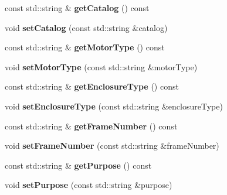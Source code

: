 \begin{DoxyCompactItemize}
\item 
\mbox{\label{class_motor_data_a051ccda5450df2ccae18db8087fe04b3}} 
const std\+::string \& {\bfseries get\+Catalog} () const
\item 
\mbox{\label{class_motor_data_ac7e264252a15a63a2fd35cbb114478e6}} 
void {\bfseries set\+Catalog} (const std\+::string \&catalog)
\item 
\mbox{\label{class_motor_data_a070b07fa26bcbd9b4ca8ccf5770387e4}} 
const std\+::string \& {\bfseries get\+Motor\+Type} () const
\item 
\mbox{\label{class_motor_data_a3b3f78a7e8e45a94df538d7663d56256}} 
void {\bfseries set\+Motor\+Type} (const std\+::string \&motor\+Type)
\item 
\mbox{\label{class_motor_data_a4272913727c7a643a199f95dd6c0ce25}} 
const std\+::string \& {\bfseries get\+Enclosure\+Type} () const
\item 
\mbox{\label{class_motor_data_a7a6a1b8600a9c7481b32bf962edcef99}} 
void {\bfseries set\+Enclosure\+Type} (const std\+::string \&enclosure\+Type)
\item 
\mbox{\label{class_motor_data_a641faa7438d7f06d3d622f7f86d09481}} 
const std\+::string \& {\bfseries get\+Frame\+Number} () const
\item 
\mbox{\label{class_motor_data_afea21a449177b09087441c58f4b81a84}} 
void {\bfseries set\+Frame\+Number} (const std\+::string \&frame\+Number)
\item 
\mbox{\label{class_motor_data_ab2f4bd7d472dfa92850a542aefbdcd3c}} 
const std\+::string \& {\bfseries get\+Purpose} () const
\item 
\mbox{\label{class_motor_data_a1c1c332dc9d549a1a50a0e2d93ec413a}} 
void {\bfseries set\+Purpose} (const std\+::string \&purpose)
\item 
\mbox{\label{class_motor_data_aae4ce578d5c7517187fba692c8b93308}} 

\end{DoxyCompactItemize}
